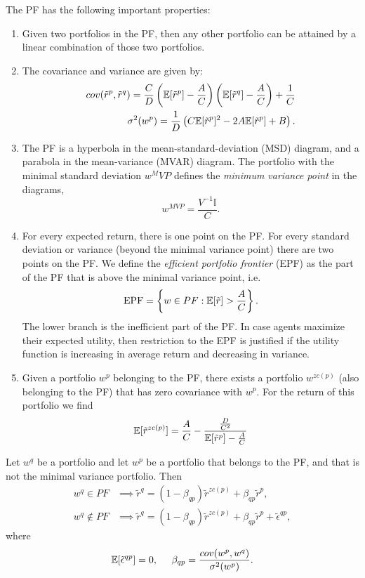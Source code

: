 \documentclass[twoside, titlepage]{article}
\begin{document}
The PF has the following important properties:
\begin{enumerate}
    \item Given two portfolios in the PF, then any other portfolio can be attained by a linear combination of those two portfolios.
    \item The covariance and variance are given by:
    \begin{align*}
        cov(\tilde{r}^p, \tilde{r}^q) = \frac{C}{D}\left(\mathbb{E}[\tilde{r}^p] - \frac{A}{C}\right)\left(\mathbb{E}[\tilde{r}^q] - \frac{A}{C}\right) + \frac{1}{C} \\
        \sigma^2(w^p) = \frac{1}{D}\left(C\mathbb{E}[\tilde{r}^p]^2 - 2A\mathbb{E}[\tilde{r}^p] + B\right).
    \end{align*}
    \item The PF is a hyperbola in the mean-standard-deviation (MSD) diagram, and a parabola in the mean-variance (MVAR) diagram. The portfolio with the minimal standard deviation $w^MVP$ defines the \textit{minimum variance point} in the diagrams,
    \[
        w^{MVP} = \frac{V^{-1} \mathbb{I}}{C}.
    \]
    \item For every expected return, there is one point on the PF. For every standard deviation or variance (beyond the minimal variance point) there are two points on the PF. We define the \textit{efficient portfolio frontier} (EPF) as the part of the PF that is above the minimal variance point, i.e.
    \[
        \text{EPF} = \left\{w \in PF : \mathbb{E}[\tilde{r}] > \frac{A}{C}\right\}.
    \]
    The lower branch is the inefficient part of the PF. In case agents maximize their expected utility, then restriction to the EPF is justified if the utility function is increasing in average return and decreasing in variance.

    \item Given a portfolio $w^p$ belonging to the PF, there exists a portfolio $w^{zc(p)}$ (also belonging to the PF) that has zero covariance with $w^p$. For the return of this portfolio we find
    \[
        \mathbb{E}[\tilde{r}^{zc(p)}] = \frac{A}{C} - \frac{\frac{D}{C^2}}{\mathbb{E}[\tilde{r}^p] - \frac{A}{C}}
    \]
\end{enumerate}

\begin{proposition} \label{prop:3.4}
    Let $w^q$ be a portfolio and let $w^p$ be a portfolio that belongs to the PF, and that is not the minimal variance portfolio. Then
    \begin{align*}
        w^q \in PF &\implies \tilde{r}^q = (1-\beta_{qp})\tilde{r}^{zc(p)} + \beta_{qp}\tilde{r}^p, \\
        w^q \not\in PF &\implies \tilde{r}^q = (1-\beta_{qp})\tilde{r}^{zc(p)} + \beta_{qp}\tilde{r}^p + \tilde{\epsilon}^{qp},
    \end{align*}
    where
    \[
        \mathbb{E}[\tilde{\epsilon}^{qp}] = 0, \;\;\;\;\; \beta_{qp} = \frac{cov(w^p, w^q)}{\sigma^2(w^p)}.
    \]
\end{proposition}
\end{document}
